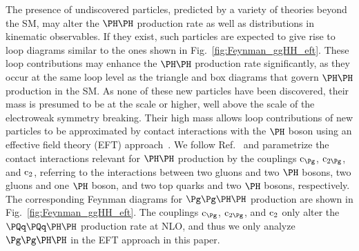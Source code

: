 The presence of undiscovered particles, predicted by a variety of theories beyond the SM, may alter the $\HH$ production rate
as well as distributions in kinematic observables.
If they exist, such particles are expected to give rise to loop diagrams similar to the ones shown in Fig.~\ref{fig:Feynman_ggHH_eft}.
These loop contributions may enhance the $\HH$ production rate significantly,
as they occur at the same loop level as the triangle and box diagrams that govern $\HH$ production in the SM.
As none of these new particles have been discovered, their mass is presumed to be at the \TeV scale or higher,
well above the scale of the electroweak symmetry breaking.
Their high mass allows loop contributions of new particles to be approximated by contact interactions with the $\PHiggs$ boson
using an effective field theory (EFT) approach~\cite{Buchmuller:1985jz,Grzadkowski:2010es}.
We follow Ref.~\cite{Carvalho:2015ttv} and parametrize the contact interactions relevant for $\HH$ production by the couplings $\cg$, $\cgg$, and $\text{c}_{2}$,
referring to the interactions between two gluons and two $\PHiggs$ bosons, two gluons and one $\PHiggs$ boson, 
and two top quarks and two $\PHiggs$ bosons, respectively.
The corresponding Feynman diagrams for $\ggHH$ production are shown in Fig.~\ref{fig:Feynman_ggHH_eft}.
The couplings $\cg$, $\cgg$, and $\text{c}_{2}$ only alter the $\qqHH$ production rate at NLO,
and thus we only analyze $\ggHH$ in the EFT approach in this paper.

